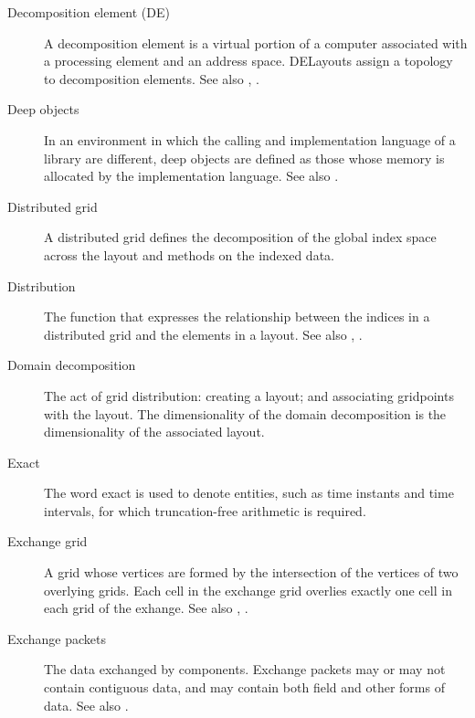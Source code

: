 \begin{description}
\item[Decomposition element (DE)] \label{glos:Decomp_Element}
  A decomposition element is a virtual portion of a computer 
  associated with a processing element and an address space.  
  DELayouts assign a topology to decomposition elements. 
  See also , .

\item[Deep objects] \label{glos:DeepObjects} In an environment
  in which the calling and implementation language of a library are
  different, deep objects are defined as those whose memory is 
  allocated by the implementation language. 
  See also . 

\item[Distributed grid] \label{glos:DistGrid}
  A distributed grid defines the decomposition of the global index space 
  across the layout and methods on the indexed data.

\item[Distribution] \label{glos:Distribution} The function that expresses
  the relationship between the indices in a distributed grid and the elements 
  in a layout. See also , 
  . 

\item[Domain decomposition] \label{glos:DomainDecomp} The act of grid 
  distribution: creating a layout; and associating gridpoints with the layout. 
  The dimensionality of the domain decomposition is the dimensionality of 
  the associated layout.

\item [Exact] \label{glos:Exact} The word exact is used
  to denote entities, such as time instants and time intervals, for 
  which truncation-free arithmetic is required. 

\item[Exchange grid] \label{glos:ExchangeGrid} A grid whose vertices are
  formed by the intersection of the vertices of two overlying grids.  Each 
  cell in the exchange grid overlies exactly one cell in each grid of the 
  exhange. See also , .

\item[Exchange packets] \label{glos:EP} The data exchanged by components.  
  Exchange packets may or may not contain contiguous data, and may contain 
  both field and other forms of data. See also .


\end{description}
